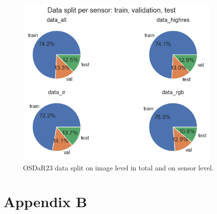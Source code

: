 \documentclass[Master,MDS,english]{BASE/twbook} %
\begin{document}
\begin{figure}[h]
\centering
\includegraphics[width=0.9\textwidth]{images/datasets/db/data_split}
\caption{OSDaR23 data split on image level in total and on sensor level. }
\label{fig:data_split}
\end{figure}



\clearpage
\chapter{Appendix B}
\end{document}
